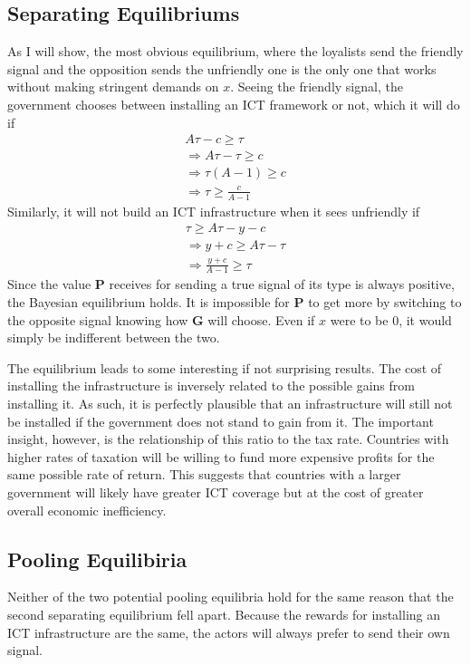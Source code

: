 \documentclass[12pt]{article}
\begin{document}
	\subsection{Separating Equilibriums}
	As I will show, the most obvious equilibrium, where the loyalists send the friendly signal and the opposition sends the unfriendly one is the only one that works without making stringent demands on $x$. Seeing the friendly signal, the government chooses between installing an ICT framework or not, which it will do if \begin{gather*}A\tau - c \geq \tau \\\Rightarrow A\tau - \tau \geq c \\\Rightarrow \tau(A - 1) \geq c \\\Rightarrow \tau \geq \frac{c}{A - 1}\end{gather*} Similarly, it will not build an ICT infrastructure when it sees unfriendly if \begin{gather*}\tau \geq A\tau - y - c\\\Rightarrow y + c \geq A\tau - \tau \\ \Rightarrow \frac{y + c}{A - 1} \geq \tau\end{gather*} Since the value \textbf{P} receives for sending a true signal of its type is always positive, the Bayesian equilibrium holds. It is impossible for \textbf{P} to get more by switching to the opposite signal knowing how \textbf{G} will choose. Even if $x$ were to be 0, it would simply be indifferent between the two. 
	
	The equilibrium leads to some interesting if not surprising results. The cost of installing the infrastructure is inversely related to the possible gains from installing it. As such, it is perfectly plausible that an infrastructure will still not be installed if the government does not stand to gain from it. The important insight, however, is the relationship of this ratio to the tax rate. Countries with higher rates of taxation will be willing to fund more expensive profits for the same possible rate of return. This suggests that countries with a larger government will likely have greater ICT coverage but at the cost of greater overall economic inefficiency.

	\subsection{Pooling Equilibiria}
	Neither of the two potential pooling equilibria hold for the same reason that the second separating equilibrium fell apart. Because the rewards for installing an ICT infrastructure are the same, the actors will always prefer to send their own signal. 
	
\end{document}
